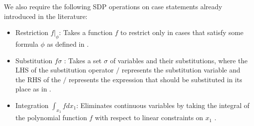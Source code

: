 \documentclass{article} %
\begin{document}
We also require the following SDP operations on case statements already introduced in the literature: 
\begin{itemize}
\item Restriction $f|_{\phi}$:  Takes a function $f$ to restrict only in cases
that satisfy some formula $\phi$ as defined in \cite{sanner_uai11}.
\item Substitution $f\sigma$ : Takes a set $\sigma$ of variables and their substitutions, where the LHS of the substitution operator $/$ represents the substitution variable and the RHS of the $/$ represents the expression that should be substituted in its place as in \cite{sanner_uai11}.
\item Integration $\int_{x_1} f dx_1$:  Eliminates continuous variables by taking the integral of the polynomial function $f$ with respect to linear constraints on $x_1$  \cite{sanner_aaai12}.
\end{itemize}
\vspace{-2mm}
\end{document}

